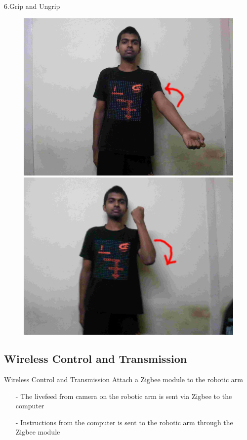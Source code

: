 \documentclass{beamer}
\begin{document}
\begin{frame}{6.Grip and Ungrip}
  \begin{figure}
      \centering
      \includegraphics[scale = .06]{gestures/61.jpg} 
      \includegraphics[scale = .06]{gestures/62.jpg} 
  \end{figure}
\end{frame}
\subsection{Wireless Control and Transmission}
\begin{frame}{Wireless Control and Transmission}
Attach a Zigbee module to the robotic arm
\begin{itemize}
\item[-] The livefeed from camera on the robotic arm is sent via Zigbee to the computer
\item[-] Instructions from the computer is sent to the robotic arm through the Zigbee module
\end{itemize}
\end{frame}
\end{document}
